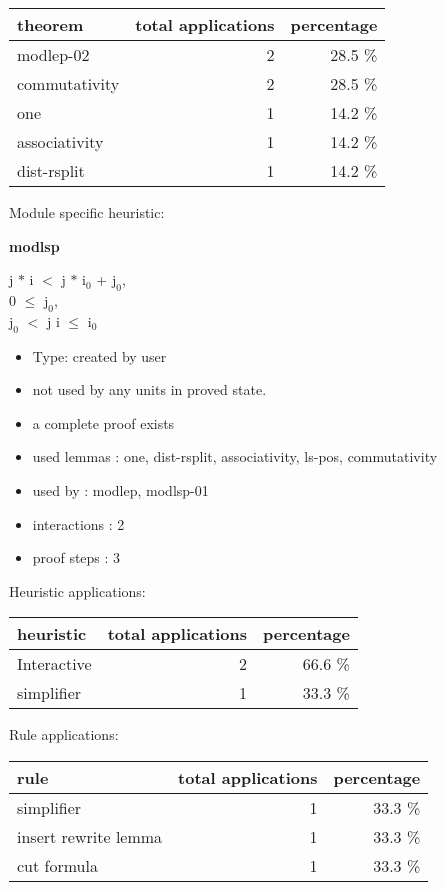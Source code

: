 \documentclass[a4paper]{article}
\begin{document}
\begin{supertabular}{l|r|r}
theorem	        & total applications & percentage \\ \hline
modlep-02 & 2 & 28.5 \% \\
commutativity & 2 & 28.5 \% \\
one & 1 & 14.2 \% \\
associativity & 1 & 14.2 \% \\
dist-rsplit & 1 & 14.2 \% \\

\end{supertabular}

Module specific heuristic:

\pagebreak

{\LARGE\bf modlsp}\label{lemma-modlsp}

\medskip

j $*$ i $<$ j $*$ $\mbox{i}_{0}$ + $\mbox{j}_{0}$, \\
0 $\le$ $\mbox{j}_{0}$, \\
$\mbox{j}_{0}$ $<$ j \Fol i $\le$ $\mbox{i}_{0}$

\begin{itemize}

\item Type: created by user

\item not used by any units in proved state.
\item       a complete proof exists
\item       used lemmas  : one, dist-rsplit, associativity, ls-pos, commutativity
\item       used by      : modlep, modlsp-01
\item       interactions : 2
\item       proof steps  : 3
\end{itemize}

\medskip


Heuristic applications:

\begin{supertabular}{l|r|r}
heuristic	& total applications & percentage \\ \hline
Interactive & 2 & 66.6 \% \\
simplifier & 1 & 33.3 \% \\

\end{supertabular}

Rule applications:

\begin{supertabular}{l|r|r}
rule	        & total applications & percentage \\ \hline
simplifier & 1 & 33.3 \% \\
insert rewrite lemma & 1 & 33.3 \% \\
cut formula & 1 & 33.3 \% \\

\end{supertabular}
\end{document}
